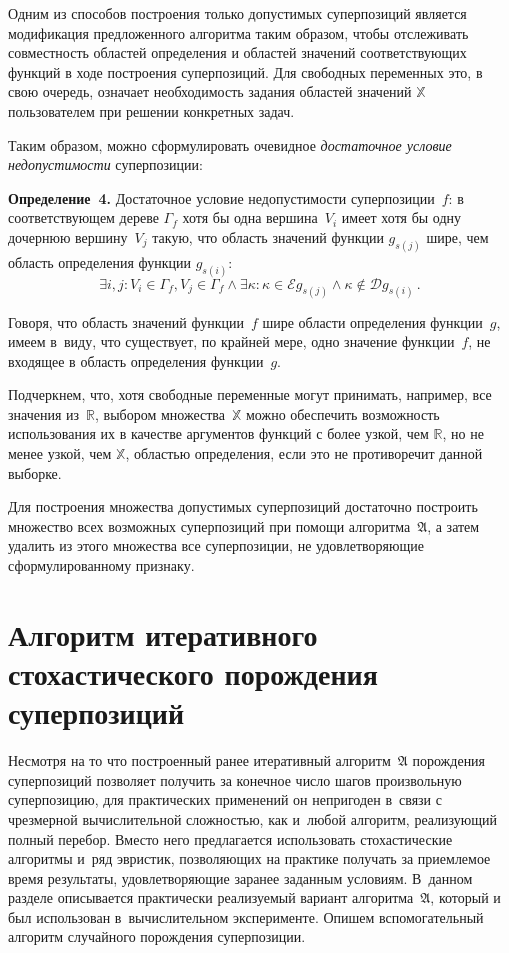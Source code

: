 \begin{multicols}{2}
\smallskip

Одним из способов построения только допустимых суперпозиций является
модификация предложенного алгоритма таким образом, чтобы отслеживать
совместность областей определения и \mbox{областей} значений соответствующих
функций в ходе построения суперпозиций. Для свободных переменных это,
в свою очередь, означает необходимость задания областей значений
$\mathbb{X}$ пользователем при решении конкретных задач.

Таким образом, можно сформулировать очевидное \textit{достаточное условие
недопустимости} суперпозиции:

\smallskip

\noindent
\textbf{Определение~4.}
  Достаточное условие недопустимости суперпозиции~$f$: в соответствующем дереве
  $\Gamma_f$ хотя бы одна вершина~$V_i$ имеет хотя бы одну дочернюю вершину~$V_j$ 
  такую, что область значений функции $g_{s(j)}$ шире, чем область
  определения функции $g_{s(i)}$:
  $$
  \exists i, j : V_i \in \Gamma_f, V_j \in \Gamma_f \wedge \exists \kappa :
    \kappa \in \mathcal{E} g_{s(j)} \wedge \kappa \notin \mathcal{D} g_{s(i)}\,.
$$


\smallskip

Говоря, что область значений функции~$f$ шире области определения функции~$g$, 
имеем в~виду, что существует, по крайней мере, одно значение функции~$f$, 
не входящее в область определения функции~$g$.

Подчеркнем, что, хотя свободные переменные могут принимать, например, все
значения из~$\mathbb{R}$, выбором множества~$\mathbb{X}$ можно обеспечить
возможность использования их в качестве аргументов функций с более узкой,
чем $\mathbb{R}$, но не менее узкой, чем $\mathbb{X}$, областью определения,
если это не противоречит данной выборке.

Для построения множества допустимых суперпозиций достаточно построить
множество всех возможных суперпозиций при помощи алгоритма~$\mathfrak{A}$,
а затем удалить из этого множества все суперпозиции, не удовлетворяющие
сформулированному признаку.

\section{Алгоритм итеративного стохастического порождения суперпозиций}

Несмотря на то что построенный ранее итеративный алгоритм~$\mathfrak{A}$ по\-рож\-де\-ния
суперпозиций позволяет получить за конечное число шагов произвольную
суперпозицию, для практических применений он непригоден в~связи с чрезмерной
вычислительной сложностью, как и~любой алгоритм, реализующий полный перебор.
Вместо него предлагается использовать стохастические алгоритмы и~ряд эвристик,
позволяющих на практике получать за приемлемое время результаты,
удовлетворяющие заранее заданным условиям. В~данном разделе описывается
практически реализуемый вариант алгоритма~$\mathfrak{A}$, который и был использован
в~вычислительном эксперименте. Опишем вспомогательный алгоритм 
случайного порождения суперпозиции.


\end{multicols}
